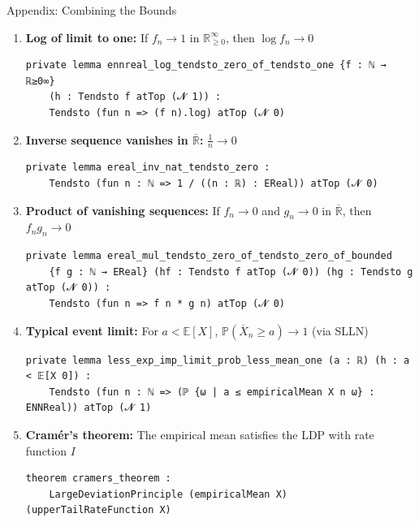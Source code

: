 \documentclass[aspectratio=169]{beamer}
\newcommand{\E}{\mathbb{E}}
\renewcommand{\P}{\mathbb{P}}
\newcommand{\R}{\mathbb{R}}
\begin{document}
\begin{frame}[fragile]{Appendix: Combining the Bounds}
  \begin{enumerate}
    \item \textbf{Log of limit to one:} If $f_n \to 1$ in $\R_{\ge 0}^\infty$, then $\log f_n \to 0$
\begin{lstlisting}[basicstyle=\ttfamily\tiny]
private lemma ennreal_log_tendsto_zero_of_tendsto_one {f : ℕ → ℝ≥0∞}
    (h : Tendsto f atTop (𝓝 1)) :
    Tendsto (fun n => (f n).log) atTop (𝓝 0)
\end{lstlisting}
    \item \textbf{Inverse sequence vanishes in $\overline{\R}$:} $\frac{1}{n} \to 0$
\begin{lstlisting}[basicstyle=\ttfamily\tiny]
private lemma ereal_inv_nat_tendsto_zero :
    Tendsto (fun n : ℕ => 1 / ((n : ℝ) : EReal)) atTop (𝓝 0)
\end{lstlisting}
    \item \textbf{Product of vanishing sequences:} If $f_n \to 0$ and $g_n \to 0$ in $\overline{\R}$, then $f_n g_n \to 0$
\begin{lstlisting}[basicstyle=\ttfamily\tiny]
private lemma ereal_mul_tendsto_zero_of_tendsto_zero_of_bounded
    {f g : ℕ → EReal} (hf : Tendsto f atTop (𝓝 0)) (hg : Tendsto g atTop (𝓝 0)) :
    Tendsto (fun n => f n * g n) atTop (𝓝 0)
\end{lstlisting}
    \item \textbf{Typical event limit:} For $a < \E[X]$, $\P(\overline{X}_n \ge a) \to 1$ \quad (via SLLN)
\begin{lstlisting}[basicstyle=\ttfamily\tiny]
private lemma less_exp_imp_limit_prob_less_mean_one (a : ℝ) (h : a < 𝔼[X 0]) :
    Tendsto (fun n : ℕ => (ℙ {ω | a ≤ empiricalMean X n ω} : ENNReal)) atTop (𝓝 1)
\end{lstlisting}
    \item \textbf{Cram\'er's theorem:} The empirical mean satisfies the LDP with rate function $I$
\begin{lstlisting}[basicstyle=\ttfamily\tiny]
theorem cramers_theorem :
    LargeDeviationPrinciple (empiricalMean X) (upperTailRateFunction X)
\end{lstlisting}
  \end{enumerate}
\end{frame}
\end{document}
